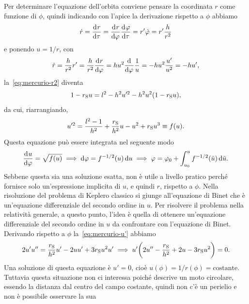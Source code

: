 Per determinare l'equazione dell'orbita conviene pensare la coordinata $r$ come
funzione di $\phi$, quindi indicando con l'apice la derivazione rispetto a
$\phi$ abbiamo
\begin{equation}
  \dot{r} = \frac{{\mathop{}\!\mathrm{d}^{}}r}{\mathop{}\!\mathrm{d} {\tau}^{}} = \frac{{\mathop{}\!\mathrm{d}^{}}r}{\mathop{}\!\mathrm{d} {\varphi}^{}} \frac{{\mathop{}\!\mathrm{d}^{}}\varphi}{\mathop{}\!\mathrm{d} {\tau}^{}} = r' \dot{\varphi}
  = r' \frac{h}{r^{2}}
\end{equation}
e ponendo $u = 1/r$, con
\begin{equation}
  \dot{r} = \frac{h}{r^{2}}r' = \frac{h}{r^{2}}\frac{{\mathop{}\!\mathrm{d}^{}}r}{\mathop{}\!\mathrm{d} {\varphi}^{}} =
  hu^{2}\frac{{\mathop{}\!\mathrm{d}^{}}}{\mathop{}\!\mathrm{d} {\varphi}^{}} \frac{1}{u} = -hu^{2}\frac{u'}{u^{2}} = -hu',
\end{equation}
la~\eqref{eq:mercurio-r2} diventa
\begin{equation}
  1 - r_{\textup{S}}u = l^{2} - h^{2}u'^{2} - h^{2}u^{2}(1 - r_{\textup{S}}u),
\end{equation}
da cui, riarrangiando,
\begin{equation}
  \label{eq:mercurio-u'}
  u'^{2} = \frac{l^{2} - 1}{h^{2}} + \frac{r_{\textup{S}}}{h^{2}}u - u^{2} +
  r_{\textup{S}}u^{3} \equiv f(u).
\end{equation}
Questa equazione può essere integrata nel seguente modo
\begin{equation}
  \frac{{\mathop{}\!\mathrm{d}^{}}u}{\mathop{}\!\mathrm{d} {\varphi}^{}} = \sqrt{f(u)} \implies \mathop{}\!\mathrm{d}\varphi = f^{-1/2}(u) \mathop{}\!\mathrm{d} u \implies
  \varphi = \varphi_{0} + \int_{u_{0}}^{u} f^{-1/2}(\tilde{u}) \mathop{}\!\mathrm{d} \tilde{u}.
\end{equation}
Sebbene questa sia una soluzione esatta, non è utile a livello pratico perché
fornisce solo un'espressione implicita di $u$, e quindi $r$, rispetto a $\phi$.
Nella risoluzione del problema di Keplero classico si giunge all'equazione di
Binet che è un'equazione differenziale del secondo ordine in $u$.  Per risolvere
il problema nella relatività generale, a questo punto, l'idea è quella di
ottenere un'equazione differenziale del secondo ordine in $u$ da confrontare con
l'equazione di Binet.  Derivando rispetto a $\phi$ la~\eqref{eq:mercurio-u'}
abbiamo
\begin{equation}
  \label{eq:mercurio1}
  2u'u'' = \frac{r_{\textup{S}}}{h^{2}}u' - 2uu' + 3r_{\textup{S}}u^{2}u'
  \implies u'\bigg(2u'' - \frac{r_{\textup{S}}}{h^{2}} + 2u -
  3r_{\textup{S}}u^{2}\bigg) = 0.
\end{equation}
Una soluzione di questa equazione è $u' = 0$, cioè
$u(\phi) = 1/r(\phi) = \text{costante}$.  Tuttavia questa situazione non ci
interessa poiché descrive un moto circolare, essendo la distanza dal centro del
campo costante, quindi non c'è un perielio e non è possibile osservare la sua
